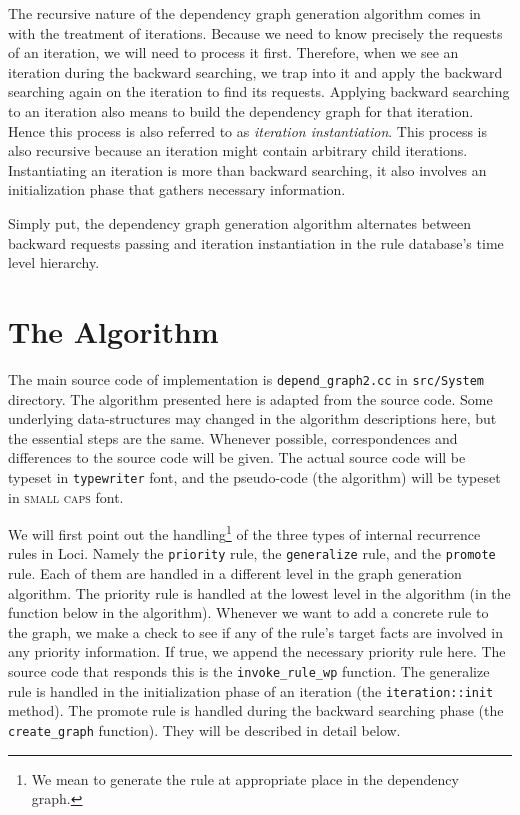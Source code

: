 \documentclass{article}
\begin{document}
The recursive nature of the dependency graph generation algorithm
comes in with the treatment of iterations. Because we need to know
precisely the requests of an iteration, we will need to process it
first. Therefore, when we see an iteration during the
backward searching, we trap into it and apply the backward searching
again on the iteration to find its requests. Applying backward
searching to an iteration also means to build the dependency graph for
that iteration. Hence this process is also referred to as
{\it iteration instantiation}. This process is also recursive because
an iteration might contain arbitrary child iterations. Instantiating
an iteration is more than backward searching, it also involves an
initialization phase that gathers necessary information. 

Simply put, the dependency graph generation algorithm alternates
between backward requests passing and iteration instantiation in the
rule database's time level hierarchy.

\section{The Algorithm}
\label{sec:algorithm}
The main source code of implementation is \texttt{depend\_graph2.cc} 
in \texttt{src/System} directory. The algorithm presented here is
adapted from the source code. Some underlying data-structures may
changed in the algorithm descriptions here, but the essential steps
are the same. Whenever possible, correspondences and differences to
the source code will be given. The actual source code will be typeset
in \texttt{typewriter} font, and the pseudo-code (the algorithm) will
be typeset in \textsc{small caps} font. 

We will first point out the handling\footnote{We mean to generate the
  rule at appropriate place in the dependency graph.} of the three
  types of internal
recurrence rules in Loci. Namely the \texttt{priority} rule, the
\texttt{generalize} rule, and the \texttt{promote} rule. Each of them
are handled in a different level in the graph generation
algorithm. The priority rule is handled at the lowest level
  in the algorithm (in the  function below in the
  algorithm). Whenever we want to add a concrete rule to the
  graph, we make a check to see if any of the rule's target facts are
  involved in any priority information. If true, we append the
  necessary priority rule here. The source code that responds this is
  the \texttt{invoke\_rule\_wp} function. The generalize rule is
  handled in the initialization phase of an iteration (the
  \texttt{iteration::init} method). The promote
  rule is handled during the backward searching phase (the
  \texttt{create\_graph} function). They will be
  described in detail below.
\end{document}
